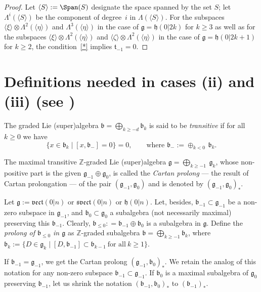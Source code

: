 \documentclass[10pt,a4paper]{amsart}
\newcommand {\Zee} {{\mathbb Z}}
\newcommand {\fb} {{\mathfrak{b}}}
\newcommand {\fg} {{\mathfrak{g}}} %
\newcommand {\fh} {{\mathfrak{h}}}
\newcommand {\fsvect} {{\mathfrak{svect}}}
\newcommand {\ft} {{\mathfrak{t}}}
\newcommand {\fvect} {{\mathfrak{vect}}} %
\newcommand {\<} [2] {{\left.\vphantom{#2}\right.^{#1\!}\!{#2}}}
\numberwithin{equation}{section}
\begin{document}
\begin{proof}
Let $\langle S\rangle:=\Span(S)$ designate the space spanned by the set $S$; let $\Lambda^i(\langle S\rangle )$ be the component of degree~$i$ in $\Lambda(\langle S\rangle)$.
For the subspaces $\langle \xi\rangle \otimes \Lambda^2(\langle \eta\rangle )$ and $\Lambda^3(\langle \eta\rangle )$ in the case of $\fg=\fh(0|2k)$ for $k\geq 3$ as well as for the subspaces $\langle \xi\rangle \otimes \Lambda^2(\langle \eta\rangle )$ and $\langle \zeta\rangle \otimes \Lambda^2(\langle \eta\rangle )$ in the case of $\fg=\fh(0|2k+1)$ for $k\geq 2$, the condition~\eqref{*} implies $\ft_{-1}=0$.
\end{proof}


\section{Definitions needed in cases (ii) and (iii) (see \cite{Shch})}\label{Defs} The graded Lie (super)algebra
$\fb=\bigoplus_{k \geqslant -d} \fb_k$
is said to be \textit{transitive} if for all~$k\geq 0$ we have
\begin{equation*}
\{x\in \fb_k \mid [x,\fb_{-}]=0\}=0, \qquad \text{where $\fb_{-}:=\oplus _{k <0}\,\fb_k$}.
\end{equation*}

The maximal transitive $\Zee$-graded Lie (super)algebra $\fg=\bigoplus_{k \geqslant -1}\ \fg_k$, whose non-positive part is the given $\fg_{-1}\oplus \fg_0$, is called the \textit{Cartan prolong}
--- the result of Cartan prolongation --- of the pair $(\fg_{-1},\fg_0)$ and is denoted by $(\fg_{-1},\fg_0)_*$.

Let $\fg := \fvect(0|n)$ or $\fsvect(0|n)$ or $\fh(0|n)$. Let, besides, $\fb_{-1} \subset \fg_{-1}$ be a non-zero subspace in $\fg_{-1}$, and $\fb_0 \subset \fg_0$ a subalgebra (not necessarily maximal) preserving this $\fb_{-1}$. Clearly, $\fb_{\leq 0}: = \fb_{-1} \oplus
\fb_0$ is a subalgebra in $\fg$. Define the \textit{prolong of
$\fb_{\leq 0}$ in $\fg$} as $\Zee$-graded subalgebra $\fb = \bigoplus_{k\geq -1}\fb_k$, where
$
\fb_k := \{D\in \fg_k \mid [D, \fb_{-1}] \subset \fb_{k-1}\ \text{for all} \ k \geq 1\}$.

If $\fb_{-1} = \fg_{-1}$, we get the
Cartan prolong
$(\fg_{-1}, \fb_0)_*$. We retain the analog of this notation for any non-zero subspace $\fb_{-1}\subset\fg_{-1}$. If $\fb_0$ is a maximal subalgebra of $\fg_0$ preserving $\fb_{-1}$, let us shrink the notation $(\fb_{-1}, \fb_0)_*$ to $(\fb_{-1})_*$.
\end{document}
